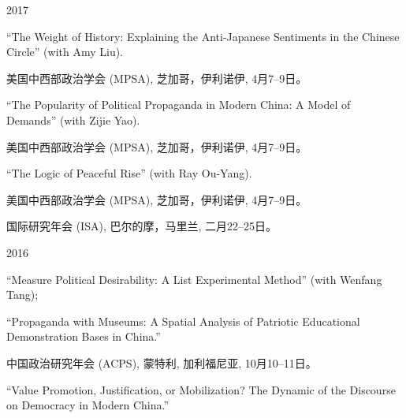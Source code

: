 \documentclass[10.5pt,]{article}
\providecommand{\tightlist}{%
  \setlength{\itemsep}{0pt}\setlength{\parskip}{0pt}}
\renewenvironment{itemize}{
  \begin{list}{}{
    \setlength{\leftmargin}{1.5em}
  }
}{
  \end{list}
}
\begin{document}
\begin{itemize}
\tightlist
\item
  2017

  \begin{itemize}
  \tightlist
  \item
    ``The Weight of History: Explaining the Anti-Japanese Sentiments in
    the Chinese Circle'' (with Amy Liu).

    \begin{itemize}
    \tightlist
    \item
      \footnotesize 美国中西部政治学会 (MPSA), 芝加哥，伊利诺伊,
      4月7--9日。
    \end{itemize}
  \item
    ``The Popularity of Political Propaganda in Modern China: A Model of
    Demands'' (with Zijie Yao).

    \begin{itemize}
    \tightlist
    \item
      \footnotesize 美国中西部政治学会 (MPSA), 芝加哥，伊利诺伊,
      4月7--9日。
    \end{itemize}
  \item
    ``The Logic of Peaceful Rise'' (with Ray Ou-Yang).

    \begin{itemize}
    \tightlist
    \item
      \footnotesize 美国中西部政治学会 (MPSA), 芝加哥，伊利诺伊,
      4月7--9日。
    \item
      \footnotesize 国际研究年会 (ISA), 巴尔的摩，马里兰, 二月22--25日。
    \end{itemize}
  \end{itemize}
\item
  2016

  \begin{itemize}
  \tightlist
  \item
    ``Measure Political Desirability: A List Experimental Method'' (with
    Wenfang Tang);
  \item
    ``Propaganda with Museums: A Spatial Analysis of Patriotic
    Educational Demonstration Bases in China.''

    \begin{itemize}
    \tightlist
    \item
      \footnotesize 中国政治研究年会 (ACPS), 蒙特利, 加利福尼亚,
      10月10--11日。
    \end{itemize}
  \item
    ``Value Promotion, Justification, or Mobilization? The Dynamic of
    the Discourse on Democracy in Modern China.''


\end{itemize}
\end{itemize}
\end{document}
